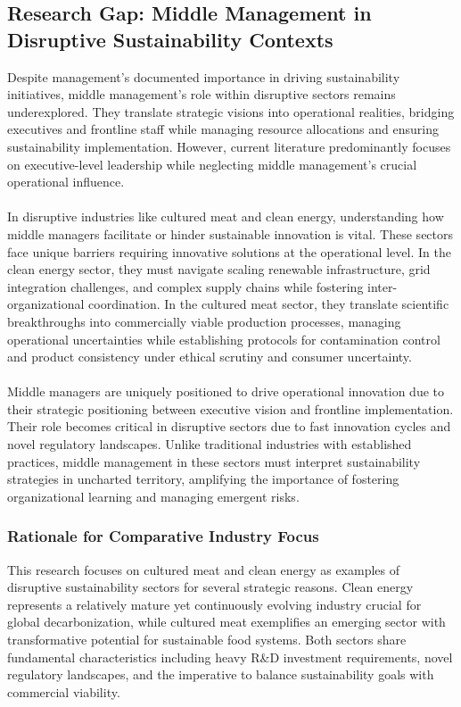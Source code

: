 	\subsection{Research Gap: Middle Management in Disruptive Sustainability Contexts}
	Despite management’s documented importance in driving sustainability initiatives, middle management’s role within disruptive sectors remains underexplored. They translate strategic visions into operational realities, bridging executives and frontline staff while managing resource allocations and ensuring sustainability implementation. However, current literature predominantly focuses on executive-level leadership while neglecting middle management’s crucial operational influence.
	
	\paragraph*{} In disruptive industries like cultured meat and clean energy, understanding how middle managers facilitate or hinder sustainable innovation is vital. These sectors face unique barriers requiring innovative solutions at the operational level. In the clean energy sector, they must navigate scaling renewable infrastructure, grid integration challenges, and complex supply chains while fostering inter-organizational coordination. In the cultured meat sector, they translate scientific breakthroughs into commercially viable production processes, managing operational uncertainties while establishing protocols for contamination control and product consistency under ethical scrutiny and consumer uncertainty.
	
	\paragraph*{} Middle managers are uniquely positioned to drive operational innovation due to their strategic positioning between executive vision and frontline implementation. Their role becomes critical in disruptive sectors due to fast innovation cycles and novel regulatory landscapes. Unlike traditional industries with established practices, middle management in these sectors must interpret sustainability strategies in uncharted territory, amplifying the importance of fostering organizational learning and managing emergent risks.
	
	\subsubsection{Rationale for Comparative Industry Focus}
	This research focuses on cultured meat and clean energy as examples of disruptive sustainability sectors for several strategic reasons. Clean energy represents a relatively mature yet continuously evolving industry crucial for global decarbonization, while cultured meat exemplifies an emerging sector with transformative potential for sustainable food systems. Both sectors share fundamental characteristics including heavy R\&D investment requirements, novel regulatory landscapes, and the imperative to balance sustainability goals with commercial viability.
	
